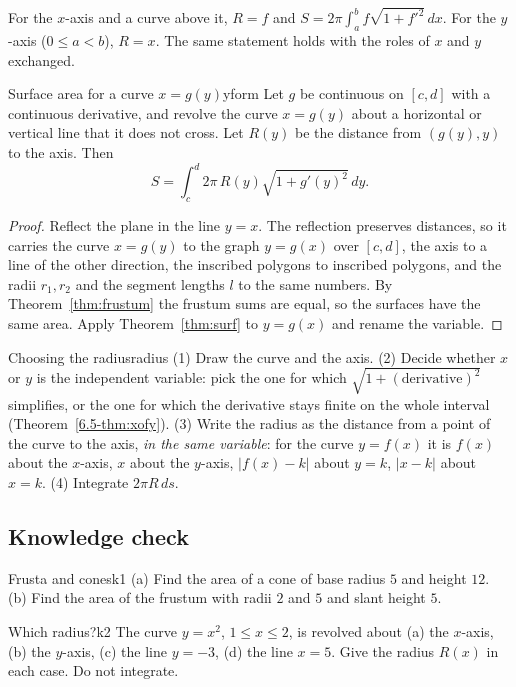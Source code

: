 \documentclass[11pt]{article}
\begin{document}
For the $x$-axis and a curve above it, $R=f$ and $S=2\pi\int_a^bf\sqrt{1+f'^2}\,dx$. For the $y$-axis ($0\le a<b$), $R=x$. The same statement holds with the roles of $x$ and $y$ exchanged.

\begin{thm}{Surface area for a curve $x=g(y)$}{yform}
Let $g$ be continuous on $[c,d]$ with a continuous derivative, and revolve the curve $x=g(y)$ about a horizontal or vertical line that it does not cross. Let $R(y)$ be the distance from $(g(y),y)$ to the axis. Then
\[
S=\int_c^d2\pi\,R(y)\sqrt{1+g'(y)^2}\,dy .
\]
\end{thm}
\begin{proof}
Reflect the plane in the line $y=x$. The reflection preserves distances, so it carries the curve $x=g(y)$ to the graph $y=g(x)$ over $[c,d]$, the axis to a line of the other direction, the inscribed polygons to inscribed polygons, and the radii $r_1,r_2$ and the segment lengths $l$ to the same numbers. By Theorem~\ref{thm:frustum} the frustum sums are equal, so the surfaces have the same area. Apply Theorem~\ref{thm:surf} to $y=g(x)$ and rename the variable.
\end{proof}

\begin{proc}{Choosing the radius}{radius}
(1) Draw the curve and the axis. (2) Decide whether $x$ or $y$ is the independent variable: pick the one for which $\sqrt{1+(\text{derivative})^2}$ simplifies, or the one for which the derivative stays finite on the whole interval (Theorem~\ref{6.5-thm:xofy}). (3) Write the radius as the distance from a point of the curve to the axis, \emph{in the same variable}: for the curve $y=f(x)$ it is $f(x)$ about the $x$-axis, $x$ about the $y$-axis, $\lvert f(x)-k\rvert$ about $y=k$, $\lvert x-k\rvert$ about $x=k$. (4) Integrate $2\pi R\,ds$.
\end{proc}

\subsection*{Knowledge check}
\begin{kc}{Frusta and cones}{k1}
(a) Find the area of a cone of base radius $5$ and height $12$. (b) Find the area of the frustum with radii $2$ and $5$ and slant height $5$.
\end{kc}

\begin{kc}{Which radius?}{k2}
The curve $y=x^2$, $1\le x\le2$, is revolved about (a) the $x$-axis, (b) the $y$-axis, (c) the line $y=-3$, (d) the line $x=5$. Give the radius $R(x)$ in each case. Do not integrate.
\end{kc}
\end{document}
